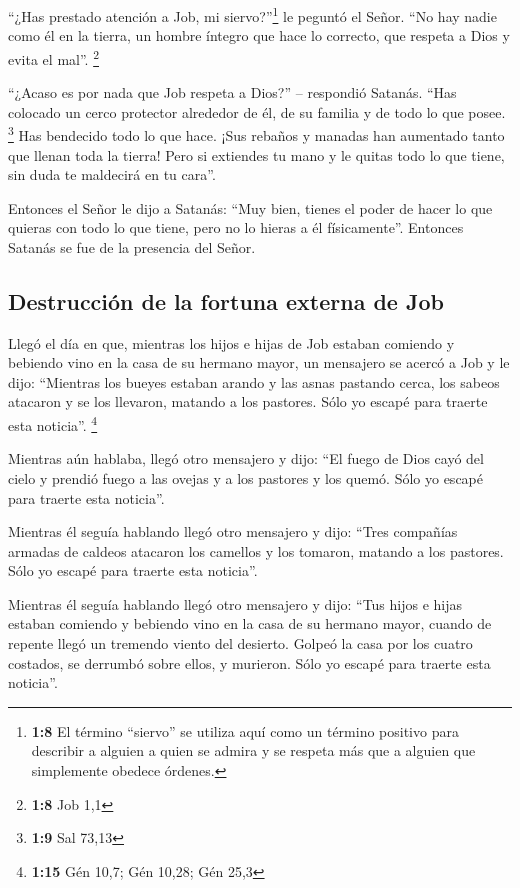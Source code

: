  ``¿Has prestado atención a Job, mi siervo?''\footnote{\textbf{1:8}
  El término ``siervo'' se utiliza aquí como un término positivo para
  describir a alguien a quien se admira y se respeta más que a alguien
  que simplemente obedece órdenes.} le peguntó el Señor. ``No hay nadie
como él en la tierra, un hombre íntegro que hace lo correcto, que
respeta a Dios y evita el mal''. \footnote{\textbf{1:8} Job 1,1}

 ``¿Acaso es por nada que Job respeta a Dios?'' --
respondió Satanás. ``Has colocado un cerco protector alrededor de él, de
su familia y de todo lo que posee. \footnote{\textbf{1:9} Sal 73,13}
 Has bendecido todo lo que hace. ¡Sus rebaños y manadas
han aumentado tanto que llenan toda la tierra!  Pero si
extiendes tu mano y le quitas todo lo que tiene, sin duda te maldecirá
en tu cara''.

 Entonces el Señor le dijo a Satanás: ``Muy bien, tienes
el poder de hacer lo que quieras con todo lo que tiene, pero no lo
hieras a él físicamente''. Entonces Satanás se fue de la presencia del
Señor.

\hypertarget{destrucciuxf3n-de-la-fortuna-externa-de-job}{%
\subsection{Destrucción de la fortuna externa de
Job}\label{destrucciuxf3n-de-la-fortuna-externa-de-job}}

 Llegó el día en que, mientras los hijos e hijas de Job
estaban comiendo y bebiendo vino en la casa de su hermano mayor,
 un mensajero se acercó a Job y le dijo: ``Mientras los
bueyes estaban arando y las asnas pastando cerca,  los
sabeos atacaron y se los llevaron, matando a los pastores. Sólo yo
escapé para traerte esta noticia''. \footnote{\textbf{1:15} Gén 10,7;
  Gén 10,28; Gén 25,3}

 Mientras aún hablaba, llegó otro mensajero y dijo: ``El
fuego de Dios cayó del cielo y prendió fuego a las ovejas y a los
pastores y los quemó. Sólo yo escapé para traerte esta noticia''.

 Mientras él seguía hablando llegó otro mensajero y dijo:
``Tres compañías armadas de caldeos atacaron los camellos y los tomaron,
matando a los pastores. Sólo yo escapé para traerte esta noticia''.

 Mientras él seguía hablando llegó otro mensajero y dijo:
``Tus hijos e hijas estaban comiendo y bebiendo vino en la casa de su
hermano mayor,  cuando de repente llegó un tremendo
viento del desierto. Golpeó la casa por los cuatro costados, se derrumbó
sobre ellos, y murieron. Sólo yo escapé para traerte esta noticia''.

